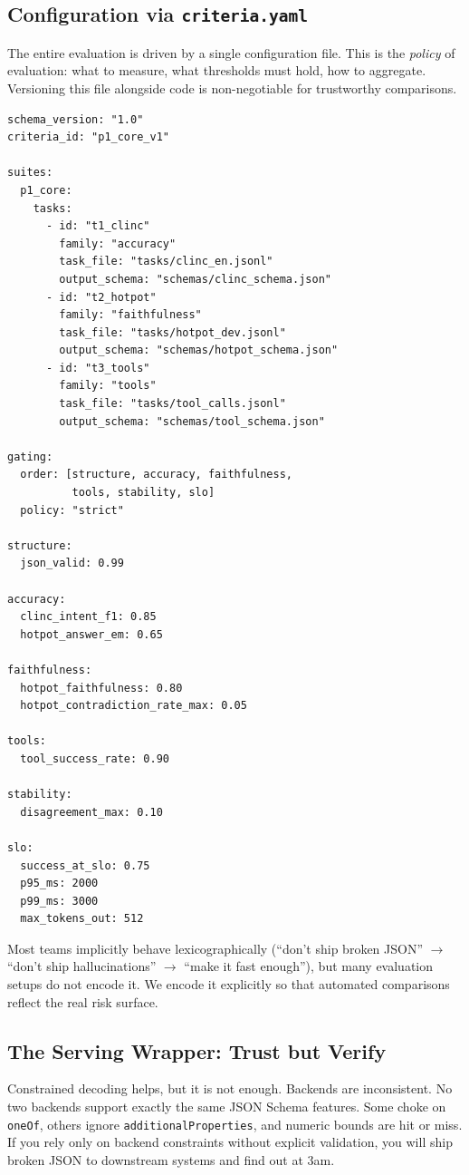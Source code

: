 \documentclass[11pt]{article}
\begin{document}
\subsection{Configuration via \texttt{criteria.yaml}}

The entire evaluation is driven by a single configuration file.
This is the \emph{policy} of evaluation: what to measure, what thresholds must hold, how to aggregate.
Versioning this file alongside code is non-negotiable for trustworthy comparisons.

\begin{lstlisting}
schema_version: "1.0"
criteria_id: "p1_core_v1"

suites:
  p1_core:
    tasks:
      - id: "t1_clinc"
        family: "accuracy"
        task_file: "tasks/clinc_en.jsonl"
        output_schema: "schemas/clinc_schema.json"
      - id: "t2_hotpot"
        family: "faithfulness"
        task_file: "tasks/hotpot_dev.jsonl"
        output_schema: "schemas/hotpot_schema.json"
      - id: "t3_tools"
        family: "tools"
        task_file: "tasks/tool_calls.jsonl"
        output_schema: "schemas/tool_schema.json"

gating:
  order: [structure, accuracy, faithfulness,
          tools, stability, slo]
  policy: "strict"

structure:
  json_valid: 0.99

accuracy:
  clinc_intent_f1: 0.85
  hotpot_answer_em: 0.65

faithfulness:
  hotpot_faithfulness: 0.80
  hotpot_contradiction_rate_max: 0.05

tools:
  tool_success_rate: 0.90

stability:
  disagreement_max: 0.10

slo:
  success_at_slo: 0.75
  p95_ms: 2000
  p99_ms: 3000
  max_tokens_out: 512
\end{lstlisting}

Most teams implicitly behave lexicographically (``don't ship broken JSON'' $\rightarrow$ ``don't ship hallucinations'' $\rightarrow$ ``make it fast enough''), but many evaluation setups do not encode it.
We encode it explicitly so that automated comparisons reflect the real risk surface.

\subsection{The Serving Wrapper: Trust but Verify}

Constrained decoding helps, but it is not enough.
Backends are inconsistent.
No two backends support exactly the same JSON Schema features.
Some choke on \texttt{oneOf}, others ignore \texttt{additionalProperties}, and numeric bounds are hit or miss.
If you rely only on backend constraints without explicit validation, you will ship broken JSON to downstream systems and find out at 3am.
\end{document}
